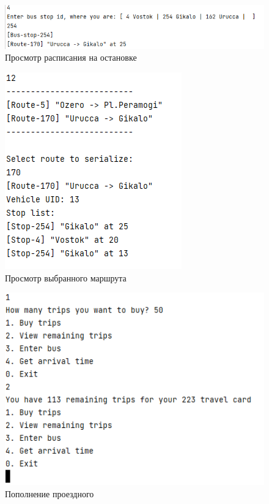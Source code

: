 \begin{figure}
    \centering
    \includegraphics[scale=0.95]{images/ViewTimeTable.png}
    \caption{Просмотр расписания на остановке}
\end{figure}

\begin{figure}
    \centering
    \includegraphics{images/RouteSerialize.png}
    \caption{Просмотр выбранного маршрута}
\end{figure}

\begin{figure}
    \centering
    \includegraphics{images/Increment_Trips.png}
    \caption{Пополнение проездного}
\end{figure}

